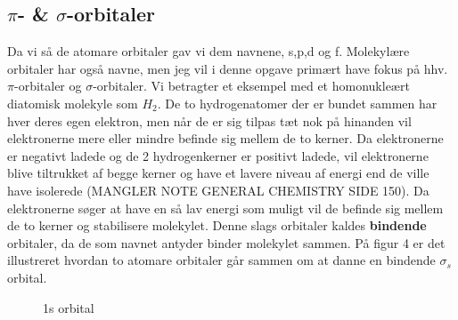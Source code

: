 \subsection{$\pi$- \& $\sigma$-orbitaler}

Da vi så de atomare orbitaler gav vi dem navnene, s,p,d og f. Molekylære orbitaler har også navne, men jeg vil i denne opgave primært have fokus på hhv. $\pi$-orbitaler og $\sigma$-orbitaler. Vi betragter et eksempel med et homonukleært diatomisk molekyle som $H_2$. De to hydrogenatomer der er bundet sammen har hver deres egen elektron, men når de er sig tilpas tæt nok på hinanden vil elektronerne mere eller mindre befinde sig mellem de to kerner. Da elektronerne er negativt ladede og de 2 hydrogenkerner er positivt ladede, vil elektronerne blive tiltrukket af begge kerner og have et lavere niveau af energi end de ville have isolerede (MANGLER NOTE GENERAL CHEMISTRY SIDE 150). Da elektronerne søger at have en så lav energi som muligt vil de befinde sig mellem de to kerner og stabilisere molekylet. Denne slags orbitaler kaldes \textbf{bindende} orbitaler, da de som navnet antyder binder molekylet sammen. På figur 4 er det illustreret hvordan to atomare orbitaler går sammen om at danne en bindende $\sigma_s$ orbital. 
\begin{center}
\begin{figure}[ht!]
  \centering
  \caption{1s orbital} \end{figure}
	\end{center}
	
